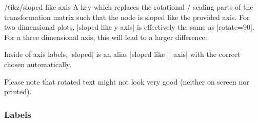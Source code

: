 \begin{pgfplotsxykeylist}{/tikz/sloped like \x\space axis}
	A key which replaces the rotational / scaling parts of the transformation matrix such that the node is sloped like the provided axis. For two dimensional plots, |sloped like y axis| is effectively the same as |rotate=90|. For a three dimensional axis, this will lead to a larger difference:
\pgfplotsexpensiveexample
\begin{codeexample}[]
\end{codeexample}

	Inside of axis labels, |sloped| is an alias |sloped like || axis| with the correct  chosen automatically.

	Please note that rotated text might not look very good (neither on screen nor printed).
\end{pgfplotsxykeylist}


\subsubsection{Labels}


